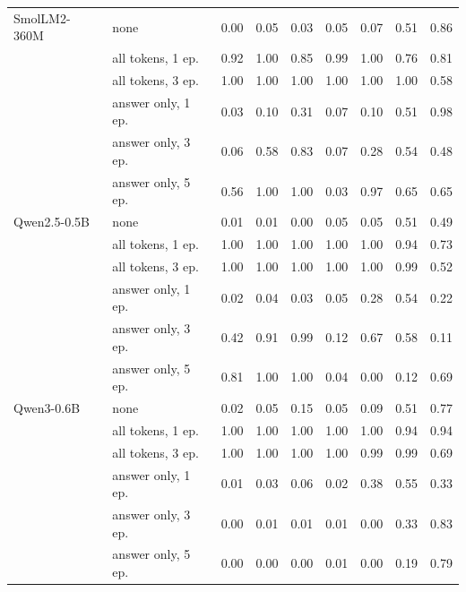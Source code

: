 \begin{tabular}{llccccccc}
SmolLM2-360M & none & 0.00 & 0.05 & 0.03 & 0.05 & 0.07 & 0.51 & 0.86\\
 & all tokens, 1 ep. & 0.92 & 1.00 & 0.85 & 0.99 & 1.00 & 0.76 & 0.81\\
 & all tokens, 3 ep. & 1.00 & 1.00 & 1.00 & 1.00 & 1.00 & 1.00 & 0.58\\
 & answer only, 1 ep. & 0.03 & 0.10 & 0.31 & 0.07 & 0.10 & 0.51 & 0.98\\
 & answer only, 3 ep. & 0.06 & 0.58 & 0.83 & 0.07 & 0.28 & 0.54 & 0.48\\
 & answer only, 5 ep. & 0.56 & 1.00 & 1.00 & 0.03 & 0.97 & 0.65 & 0.65\\
\addlinespace
Qwen2.5-0.5B & none & 0.01 & 0.01 & 0.00 & 0.05 & 0.05 & 0.51 & 0.49\\
 & all tokens, 1 ep. & 1.00 & 1.00 & 1.00 & 1.00 & 1.00 & 0.94 & 0.73\\
 & all tokens, 3 ep. & 1.00 & 1.00 & 1.00 & 1.00 & 1.00 & 0.99 & 0.52\\
 & answer only, 1 ep. & 0.02 & 0.04 & 0.03 & 0.05 & 0.28 & 0.54 & 0.22\\
 & answer only, 3 ep. & 0.42 & 0.91 & 0.99 & 0.12 & 0.67 & 0.58 & 0.11\\
 & answer only, 5 ep. & 0.81 & 1.00 & 1.00 & 0.04 & 0.00 & 0.12 & 0.69\\
\addlinespace
Qwen3-0.6B & none & 0.02 & 0.05 & 0.15 & 0.05 & 0.09 & 0.51 & 0.77\\
 & all tokens, 1 ep. & 1.00 & 1.00 & 1.00 & 1.00 & 1.00 & 0.94 & 0.94\\
 & all tokens, 3 ep. & 1.00 & 1.00 & 1.00 & 1.00 & 0.99 & 0.99 & 0.69\\
 & answer only, 1 ep. & 0.01 & 0.03 & 0.06 & 0.02 & 0.38 & 0.55 & 0.33\\
 & answer only, 3 ep. & 0.00 & 0.01 & 0.01 & 0.01 & 0.00 & 0.33 & 0.83\\
 & answer only, 5 ep. & 0.00 & 0.00 & 0.00 & 0.01 & 0.00 & 0.19 & 0.79\\
\bottomrule
\end{tabular}
